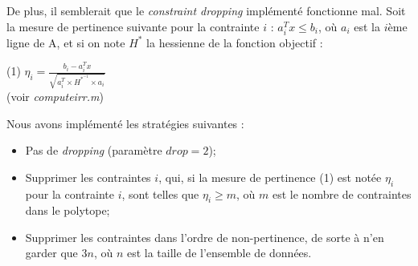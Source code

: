 \documentclass{article}
\begin{document}
De plus, il semblerait que le \emph{constraint dropping} implémenté fonctionne mal. Soit la mesure de pertinence suivante pour la contrainte $i$ : $a_i^Tx \leq b_i$, où $a_i$ est la $i$ème ligne de A, et si on note $H^*$ la hessienne de la fonction objectif :\\

\begin{center}
(1) $\eta_i = \frac{b_i - a_i^Tx}{\sqrt{a_i^T \times H^*^{-1} \times a_i}}$\\
(voir \emph{computeirr.m})
\end{center}

Nous avons implémenté les stratégies suivantes :\\

\begin{itemize}
\item Pas de \emph{dropping} (paramètre $drop = 2$);
\item Supprimer les contraintes $i$, qui, si la mesure de pertinence (1) est notée $\eta_i$ pour la contrainte $i$, sont telles que $\eta_i \geq m$, où $m$ est le nombre de contraintes dans le polytope;
\item Supprimer les contraintes dans l'ordre de non-pertinence, de sorte à n'en garder que $3n$, où $n$ est la taille de l'ensemble de données.
\end{itemize}
\end{document}
